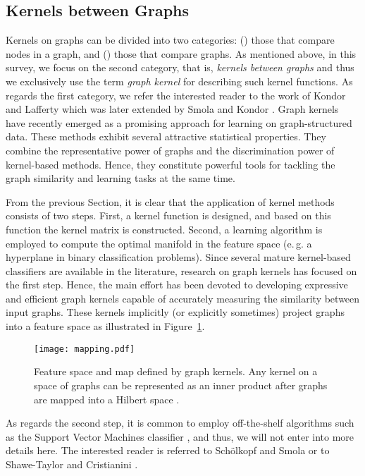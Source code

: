 \documentclass[twoside,11pt]{article}
\newcommand{\eg}{e.\,g. }
\begin{document}
\subsection{Kernels between Graphs}
Kernels on graphs can be divided into two categories: () those that compare nodes in a graph, and () those that compare graphs.
As mentioned above, in this survey, we focus on the second category, that is, \textit{kernels between graphs} and thus we exclusively use the term \textit{graph kernel }for describing such kernel functions.
As regards the first category, we refer the interested reader to the work of Kondor and Lafferty \citeyear{kondor2002diffusion} which was later extended by Smola and Kondor \citeyear{smola2003kernels}.
Graph kernels have recently emerged as a promising approach for learning on graph-structured data.
These methods exhibit several attractive statistical properties.
They combine the representative power of graphs and the discrimination power of kernel-based methods.
Hence, they constitute powerful tools for tackling the graph similarity and learning tasks at the same time.

From the previous Section, it is clear that the application of kernel methods consists of two steps.
First, a kernel function is designed, and based on this function the kernel matrix is constructed.
Second, a learning algorithm is employed to compute the optimal manifold in the feature space (\eg a hyperplane in binary classification problems).
Since several mature kernel-based classifiers are available in the literature, research on graph kernels has focused on the first step.
Hence, the main effort has been devoted to developing expressive and efficient graph kernels capable of accurately measuring the similarity between input graphs.
These kernels implicitly (or explicitly sometimes) project graphs into a feature space  as illustrated in Figure~\ref{fig:mapping}.
\begin{figure}
  \centering
  \texttt{[image: mapping.pdf]}
    \caption{Feature space and map defined by graph kernels.
    Any kernel on a space of graphs  can be represented as an inner product after graphs are mapped into a Hilbert space .}
    \label{fig:mapping}
\end{figure}
As regards the second step, it is common to employ off-the-shelf algorithms such as the Support Vector Machines classifier \cite{boser1992training}, and thus, we will not enter into more details here.
The interested reader is referred to Sch{\"o}lkopf and Smola \citeyear{scholkopf2002learning} or to Shawe-Taylor and Cristianini \citeyear{shawe2004kernel}.
\end{document}
